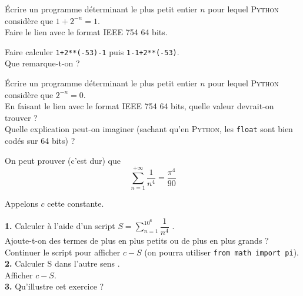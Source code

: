 \begin{exercice}
    \'Ecrire un programme déterminant le plus petit entier $n$ pour lequel \textsc{Python} considère que $1+2^{-n}=1$.\\
    Faire le lien avec le format IEEE 754 64 bits.
\end{exercice}

\begin{exercice}
    Faire calculer \texttt{1+2**(-53)-1} puis \texttt{1-1+2**(-53)}.\\
    Que remarque-t-on ?\\
\end{exercice}

\begin{exercice}
    \'Ecrire un programme déterminant le plus petit entier $n$ pour lequel \textsc{Python} considère que $2^{-n}=0$.\\
    En faisant le lien avec le format IEEE 754 64 bits, quelle valeur devrait-on trouver ?\\
    Quelle explication peut-on imaginer (sachant qu'en \textsc{Python}, les \texttt{float} sont bien codés sur 64 bits) ?
\end{exercice}

\begin{exercice}
    On peut prouver (c'est dur) que $$\sum_{n=1}^{+\infty}\dfrac{1}{n^4}=\dfrac{\pi^4}{90}$$

    Appelons $c$ cette constante.

    \textbf{1.} Calculer à l'aide d'un script $\displaystyle S=\sum_{n=1}^{10^6}\dfrac{1}{n^4}$ .\\

    Ajoute-t-on des termes de plus en plus petits ou de plus en plus grands ?\\
    Continuer le script pour afficher $c-S$ (on pourra utiliser \texttt{from math import pi}).\\

    \textbf{2.} Calculer S \og dans l'autre sens \fg.\\
    Afficher $c-S$.\\

    \textbf{3.} Qu'illustre cet exercice ?
\end{exercice}


